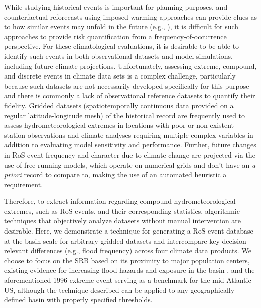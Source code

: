 \documentclass[nhess, manuscript]{copernicus}
\begin{document}
While studying historical events is important for planning purposes, and counterfactual reforecasts using imposed warming approaches can provide clues as to how similar events may unfold in the future (e.g., \citet{pettett2023the}), it is difficult for such approaches to provide risk quantification from a frequency-of-occurrence perspective. For these climatological evaluations, it is desirable to be able to identify such events in both observational datasets and model simulations, including future climate projections.
Unfortunately, assessing extreme, compound, and discrete events in climate data sets is a complex challenge, particularly because such datasets are not necessarily developed specifically for this purpose \citep{angelil2017an,parker2020model} and there is commonly a lack of observational reference datasets to quantify their fidelity.
Gridded datasets (spatiotemporally continuous data provided on a regular latitude-longitude mesh) of the historical record are frequently used to assess hydrometeorological extremes in locations with poor or non-existent station observations and climate analyses requiring multiple complex variables in addition to evaluating model sensitivity and performance.
Further, future changes in RoS event frequency and character due to climate change are projected via the use of free-running models, which operate on numerical grids and don't have an \textit{a priori} record to compare to, making the use of an automated heuristic a requirement.

Therefore, to extract information regarding compound hydrometeorological extremes, such as RoS events, and their corresponding statistics, algorithmic techniques that objectively analyze datasets without manual intervention are desirable.
Here, we demonstrate a technique for generating a RoS event database at the basin scale for arbitrary gridded datasets and intercompare key decision-relevant differences (e.g., flood frequency) across four climate data products.
We choose to focus on the SRB based on its proximity to major population centers, existing evidence for increasing flood hazards and exposure in the basin \citep{sharma2021regional}, and the aforementioned 1996 extreme event serving as a benchmark for the mid-Atlantic US, although the technique described can be applied to any geographically defined basin with properly specified thresholds.

\end{document}
